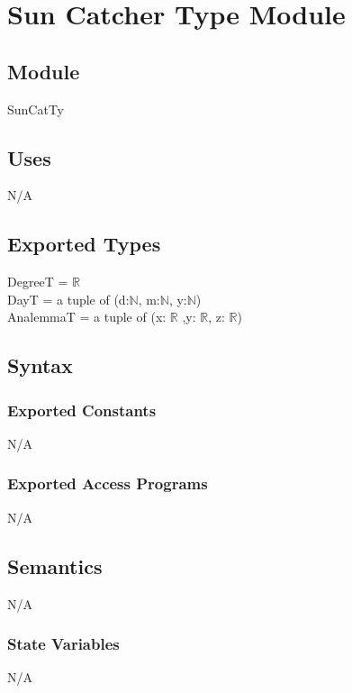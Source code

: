 \documentclass[12pt, titlepage]{article}
\begin{document}
\section{Sun Catcher Type Module} \label{ModuleSCTM} 

\subsection{Module}
SunCatTy

\subsection{Uses}

N/A\\

\subsection{Exported Types}

DegreeT = $\mathbb{R}$\\
DayT = a tuple of (d:$\mathbb{N}$, m:$\mathbb{N}$, y:$\mathbb{N}$)\\
AnalemmaT = a tuple of (x: $\mathbb{R}$ ,y: $\mathbb{R}$, z: $\mathbb{R}$)\\

\subsection{Syntax}

\subsubsection{Exported Constants}
N/A\\

\subsubsection{Exported Access Programs}
N/A\\

\subsection{Semantics}
N/A\\
\subsubsection{State Variables}
N/A\\
\end{document}
